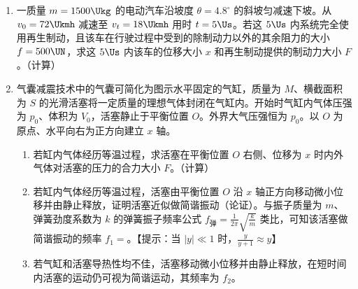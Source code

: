 \documentclass[\gkver]{gaokaozhenti}
\begin{document}
\begin{enumerate}
\begin{enumerate}
	{$b_{1}$ 和 $b_{2}$}
	{$c_{1}$ 和 $c_{2}$}
	{$d_{1}$ 和 $d_{2}$}

	\item
	一质量 $m=1500 \Ukg$ 的电动汽车沿坡度 $\theta=4.8^{\circ}$ 的斜坡匀减速下坡。从 $v_{0}=72 \Ukmh$ 减速至 $v_{t}=18 \Ukmh$ 用时 $t=5 \Us$。若这 $5 \Us$ 内系统完全使用再生制动，且该车在行驶过程中受到的除制动力以外的其余阻力的大小 $f=500 \UN$，求这 $5 \Us$ 内该车的位移大小 $x$ 和再生制动提供的制动力大小 $F$。（计算）

	\item
	气囊减震技术中的气囊可简化为图示水平固定的气缸，质量为 $M$、横截面积为 $S$ 的光滑活塞将一定质量的理想气体封闭在气缸内。开始时气缸内气体压强为 $p_{0}$、体积为 $V_{0}$，活塞静止于平衡位置 $O$。外界大气压强恒为 $p_{0}$。以 $O$ 为原点、水平向右为正方向建立 $x$ 轴。

	\onepicture[align=right, w=3.84cm]{}

	\begin{enumerate}
		\item
		若缸内气体经历等温过程，求活塞在平衡位置 $O$ 右侧、位移为 $x$ 时内外气体对活塞的压力的合力大小 $F$。（计算）

		\item
		若缸内气体经历等温过程，活塞由平衡位置 $O$ 沿 $x$ 轴正方向移动微小位移并由静止释放，证明活塞近似做简谐振动（论证）。与振子质量为 $m$、弹簧劲度系数为 $k$ 的弹簧振子频率公式 $f_{\text{弹}}=\frac{1}{2\pi}\sqrt{\frac{k}{m}}$ 类比，可知该活塞做简谐振动的频率 $f_{1}=$。【提示：当 $|y|\ll 1$ 时，$\frac{y}{y+1}\approx y$】

		\item
		若气缸和活塞导热性均不佳，活塞移动微小位移并由静止释放，在短时间内活塞的运动仍可视为简谐运动，其频率为 $f_{2}$。

	\end{enumerate}
\end{enumerate}
\end{enumerate}
\end{document}
